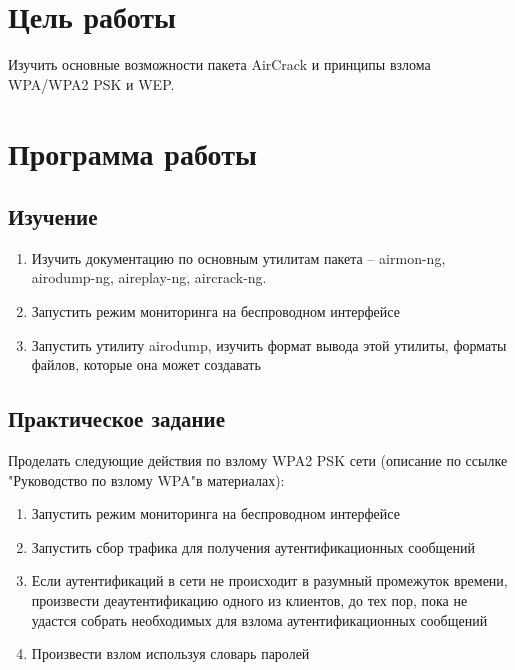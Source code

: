 \documentclass[a4paper]{article}
\begin{document}
\vfill %


\tableofcontents
\newpage


\section{Цель работы}

Изучить основные возможности пакета AirCrack и принципы взлома WPA/WPA2 PSK и WEP.

\section{Программа работы}

\subsection{Изучение}

\begin{enumerate}

\item Изучить документацию по основным утилитам пакета – airmon-ng, airodump-ng, aireplay-ng, aircrack-ng.

\item Запустить режим мониторинга на беспроводном интерфейсе

\item Запустить утилиту airodump, изучить формат вывода этой утилиты, форматы файлов, которые она может создавать

\end{enumerate}

\subsection{Практическое задание}

Проделать следующие действия по взлому WPA2 PSK сети (описание по ссылке "Руководство по взлому WPA"в материалах):

\begin{enumerate}

\item Запустить режим мониторинга на беспроводном интерфейсе

\item Запустить сбор трафика для получения аутентификационных сообщений

\item Если аутентификаций в сети не происходит в разумный промежуток времени, произвести деаутентификацию одного из клиентов, до тех пор, пока не удастся собрать необходимых для взлома аутентификационных сообщений

\item Произвести взлом используя словарь паролей

\end{enumerate}
\end{document}
